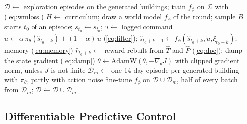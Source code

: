 \documentclass{article}
\begin{document}
\begin{algorithm}[H]
\caption{On-policy rounds of world-model training and DPC training of the policy.}
\label{alg:train}
\scriptsize
\begin{algorithmic}[1]
\State $\mathcal{D} \gets$ exploration episodes on the generated buildings; train $f_\phi$ on $\mathcal{D}$ with (\ref{eq:wmloss})
   
    \State $H \gets$ curriculum; draw a world model $f_\phi$ of the round; sample $B$ starts $t_0$ of an episode; $\hat{s}_{t_0} \gets s_{t_0}$; $\tilde{u} \gets$ logged command
      \State $\tilde{u} \gets \alpha\, \pi_\theta(\hat{s}_{t_0+k}) + (1-\alpha)\,\tilde{u}$ (\ref{eq:filter}); \quad $\hat{s}_{t_0+k+1} \gets f_\phi(\hat{s}_{t_0+k}, \tilde{u}, \xi_{t_0+k})$; \quad memory (\ref{eq:memory})
      \State $\hat{r}_{t_0+k} \gets$ reward rebuilt from $\hat{T}$ and $\hat{P}$ (\ref{eq:dpc}); \quad damp the state gradient (\ref{eq:damp})
    \EndFor
    \State $\theta \gets \mathrm{AdamW}(\theta, -\nabla_\theta J)$ with clipped gradient norm, unless $J$ is not finite
  \EndFor
  \State $\mathcal{D}_m \gets$ one 14-day episode per generated building with $\pi_\theta$, partly with action noise
  \State fine-tune $f_\phi$ on $\mathcal{D} \cup \mathcal{D}_m$, half of every batch from $\mathcal{D}_m$; \quad $\mathcal{D} \gets \mathcal{D} \cup \mathcal{D}_m$
\EndFor
\end{algorithmic}
\end{algorithm}


\subsection{Differentiable Predictive Control}
\end{document}
